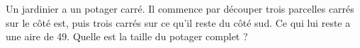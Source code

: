 
\begin{exercice}\label{exosmath-0208}

    \begin{multicols}{2}

    Un jardinier a un potager carré. Il commence par découper trois parcelles carrés sur le côté est, puis trois carrés sur ce qu'il reste du côté sud. Ce qui lui reste a une aire de \unit{49}{\squared\meter}. Quelle est la taille du potager complet ?

    \columnbreak
    \begin{center}

    \end{center}
    \end{multicols}
    
\end{exercice}
